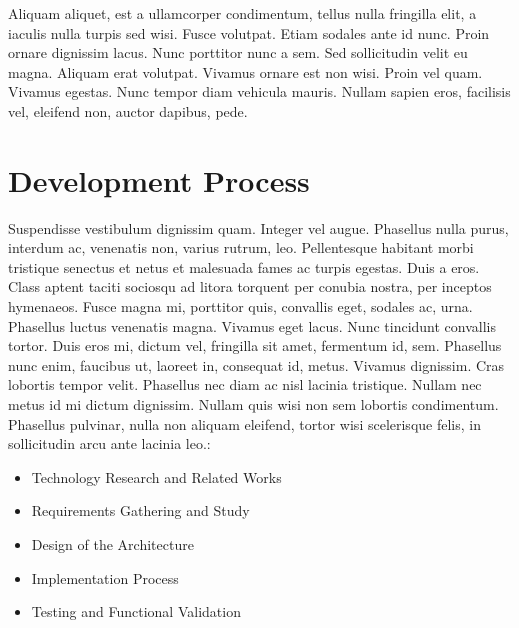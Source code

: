 \label{chap:implement}

Aliquam aliquet, est a ullamcorper condimentum, tellus nulla fringilla elit, a iaculis nulla turpis sed wisi. Fusce volutpat. Etiam sodales ante id nunc. Proin ornare dignissim lacus. Nunc porttitor nunc a sem. Sed sollicitudin velit eu magna. Aliquam erat volutpat. Vivamus ornare est non wisi. Proin vel quam. Vivamus egestas. Nunc tempor diam vehicula mauris. Nullam sapien eros, facilisis vel, eleifend non, auctor dapibus, pede. 
\section{Development Process}
Suspendisse vestibulum dignissim quam. Integer vel augue. Phasellus nulla purus, interdum ac, venenatis non, varius rutrum, leo. Pellentesque habitant morbi tristique senectus et netus et malesuada fames ac turpis egestas. Duis a eros. Class aptent taciti sociosqu ad litora torquent per conubia nostra, per inceptos hymenaeos. Fusce magna mi, porttitor quis, convallis eget, sodales ac, urna. Phasellus luctus venenatis magna. Vivamus eget lacus. Nunc tincidunt convallis tortor. Duis eros mi, dictum vel, fringilla sit amet, fermentum id, sem. Phasellus nunc enim, faucibus ut, laoreet in, consequat id, metus. Vivamus dignissim. Cras lobortis tempor velit. Phasellus nec diam ac nisl lacinia tristique. Nullam nec metus id mi dictum dignissim. Nullam quis wisi non sem lobortis condimentum. Phasellus pulvinar, nulla non aliquam eleifend, tortor wisi scelerisque felis, in sollicitudin arcu ante lacinia leo.:

\begin{itemize}
\item{Technology Research and Related Works}
\item{Requirements Gathering and Study}
\item{Design of the Architecture}
\item{Implementation Process}
\item{Testing and Functional Validation}
\end{itemize}

